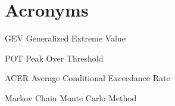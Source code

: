 
\chapter{Acronyms}
\begin{description}
\item{GEV} Generalized Extreme Value
\item{POT} Peak Over Threshold
\item{ACER} Average Conditional Exceedance Rate
\item[MCMC] Markov Chain Monte Carlo Method
\end{description}